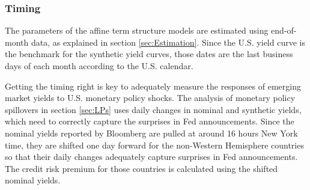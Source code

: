 {%

\subsubsection{Timing}
The parameters of the affine term structure models are estimated using end-of-month data, as explained in section \ref{sec:Estimation}.
Since the U.S. yield curve is the benchmark for the synthetic yield curves, those dates are the last business days of each month according to the U.S. calendar.

Getting the timing right is key to adequately measure the responses of emerging market yields to U.S. monetary policy shocks.
The analysis of monetary policy spillovers in section \ref{sec:LPs} uses daily changes in nominal and synthetic yields, which need to correctly capture the surprises in Fed announcements.
Since the nominal yields reported by Bloomberg are pulled at around 16 hours New York time, they are shifted one day forward for the non-Western Hemisphere countries so that their daily changes adequately capture surprises in Fed announcements.
The credit risk premium for those countries is calculated using the shifted nominal yields.



}{}	%


